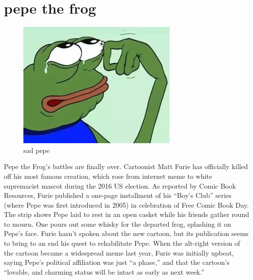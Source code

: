 \documentclass[10pt,a4paper]{article}
\begin{document}
\section{pepe the frog}
\begin{figure}
\begin{center}
\includegraphics  [width=0.5  \textwidth] {image/frog.jpg} %
\end{center}
\caption{sad pepe}
\label{figure zzzz}
\end{figure}
Pepe the Frog’s battles are finally over. Cartoonist Matt Furie has officially killed off his most famous creation, which rose from internet meme to white supremacist mascot during the 2016 US election. As reported by Comic Book Resources, Furie published a one-page installment of his “Boy’s Club” series (where Pepe was first introduced in 2005) in celebration of Free Comic Book Day. The strip shows Pepe laid to rest in an open casket while his friends gather round to mourn. One pours out some whisky for the departed frog, splashing it on Pepe’s face. 
Furie hasn’t spoken about the new cartoon, but its publication seems to bring to an end his quest to rehabilitate Pepe. When the alt-right version of the cartoon became a widespread meme last year, Furie was initially upbeat, saying Pepe’s political affiliation was just “a phase,” and that the cartoon’s “lovable, and charming status will be intact as early as next week.” 
\end{document}
